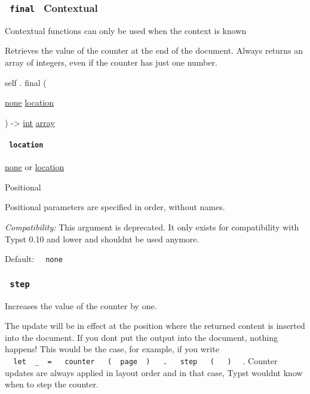 \subsubsection{\texorpdfstring{\texttt{\ final\ } {{ Contextual
}}}{ final   Contextual }}\label{definitions-final}

\label{definitions-final-contextual-tooltip}
Contextual functions can only be used when the context is known

Retrieves the value of the counter at the end of the document. Always
returns an array of integers, even if the counter has just one number.

self { . } { final } (

{ \href{/docs/reference/foundations/none/}{none}
\href{/docs/reference/introspection/location/}{location} }

) -\textgreater{} \href{/docs/reference/foundations/int/}{int}
\href{/docs/reference/foundations/array/}{array}

\paragraph{\texorpdfstring{\texttt{\ location\ }}{ location }}\label{definitions-final-location}

\href{/docs/reference/foundations/none/}{none} {or}
\href{/docs/reference/introspection/location/}{location}

{{ Positional }}

\label{definitions-final-location-positional-tooltip}
Positional parameters are specified in order, without names.

\emph{Compatibility:} This argument is deprecated. It only exists for
compatibility with Typst 0.10 and lower and shouldn\textquotesingle t be
used anymore.

Default: \texttt{\ }{\texttt{\ none\ }}\texttt{\ }

\subsubsection{\texorpdfstring{\texttt{\ step\ }}{ step }}\label{definitions-step}

Increases the value of the counter by one.

The update will be in effect at the position where the returned content
is inserted into the document. If you don\textquotesingle t put the
output into the document, nothing happens! This would be the case, for
example, if you write
\texttt{\ }{\texttt{\ let\ }}\texttt{\ \_\ }{\texttt{\ =\ }}\texttt{\ }{\texttt{\ counter\ }}\texttt{\ }{\texttt{\ (\ }}\texttt{\ page\ }{\texttt{\ )\ }}\texttt{\ }{\texttt{\ .\ }}\texttt{\ }{\texttt{\ step\ }}\texttt{\ }{\texttt{\ (\ }}\texttt{\ }{\texttt{\ )\ }}\texttt{\ }
. Counter updates are always applied in layout order and in that case,
Typst wouldn\textquotesingle t know when to step the counter.

